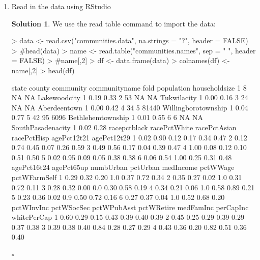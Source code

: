 \documentclass[twoside]{article}
\theoremstyle{definition}
\newtheorem*{solutionT}{Solution}
\newenvironment{solution}{\begin{cBox}\begin{solutionT}}{\hfill{\scriptsize\ensuremath{\square}}\end{solutionT}\end{cBox}}
\theoremstyle{definition}
\begin{document}
\begin{enumerate}
\item Read in the data using RStudio
\begin{solution}
We use the read table command to import the data:
\begin{Schunk}
\begin{Sinput}
> data <- read.csv("communities.data", na.strings = "?", header = FALSE)
> #head(data)
> name <- read.table("communities.names", sep = " ", header = FALSE)
> #name[,2]
> df <- data.frame(data)
> colnames(df) <- name[,2]
> head(df)
\end{Sinput}
\begin{Soutput}
  state county community       communityname fold population householdsize
1     8     NA        NA        Lakewoodcity    1       0.19          0.33
2    53     NA        NA         Tukwilacity    1       0.00          0.16
3    24     NA        NA        Aberdeentown    1       0.00          0.42
4    34      5     81440 Willingborotownship    1       0.04          0.77
5    42     95      6096   Bethlehemtownship    1       0.01          0.55
6     6     NA        NA   SouthPasadenacity    1       0.02          0.28
  racepctblack racePctWhite racePctAsian racePctHisp agePct12t21 agePct12t29
1         0.02         0.90         0.12        0.17        0.34        0.47
2         0.12         0.74         0.45        0.07        0.26        0.59
3         0.49         0.56         0.17        0.04        0.39        0.47
4         1.00         0.08         0.12        0.10        0.51        0.50
5         0.02         0.95         0.09        0.05        0.38        0.38
6         0.06         0.54         1.00        0.25        0.31        0.48
  agePct16t24 agePct65up numbUrban pctUrban medIncome pctWWage pctWFarmSelf
1        0.29       0.32      0.20      1.0      0.37     0.72         0.34
2        0.35       0.27      0.02      1.0      0.31     0.72         0.11
3        0.28       0.32      0.00      0.0      0.30     0.58         0.19
4        0.34       0.21      0.06      1.0      0.58     0.89         0.21
5        0.23       0.36      0.02      0.9      0.50     0.72         0.16
6        0.27       0.37      0.04      1.0      0.52     0.68         0.20
  pctWInvInc pctWSocSec pctWPubAsst pctWRetire medFamInc perCapInc whitePerCap
1       0.60       0.29        0.15       0.43      0.39      0.40        0.39
2       0.45       0.25        0.29       0.39      0.29      0.37        0.38
3       0.39       0.38        0.40       0.84      0.28      0.27        0.29
4       0.43       0.36        0.20       0.82      0.51      0.36        0.40

\end{Soutput}
\end{Schunk}
\end{solution}
\end{enumerate}
\end{document}

